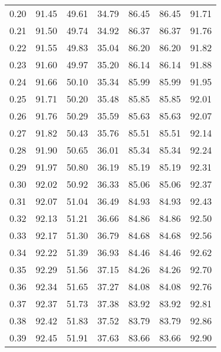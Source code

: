 \begin{tabular}{|c|c|c|c|c|c|c|}
      0.20 &     91.45 &     49.61 &      34.79 &   86.45 &      86.45 &         91.71 \\
      0.21 &     91.50 &     49.74 &      34.92 &   86.37 &      86.37 &         91.76 \\
      0.22 &     91.55 &     49.83 &      35.04 &   86.20 &      86.20 &         91.82 \\
      0.23 &     91.60 &     49.97 &      35.20 &   86.14 &      86.14 &         91.88 \\
      0.24 &     91.66 &     50.10 &      35.34 &   85.99 &      85.99 &         91.95 \\
      0.25 &     91.71 &     50.20 &      35.48 &   85.85 &      85.85 &         92.01 \\
      0.26 &     91.76 &     50.29 &      35.59 &   85.63 &      85.63 &         92.07 \\
      0.27 &     91.82 &     50.43 &      35.76 &   85.51 &      85.51 &         92.14 \\
      0.28 &     91.90 &     50.65 &      36.01 &   85.34 &      85.34 &         92.24 \\
      0.29 &     91.97 &     50.80 &      36.19 &   85.19 &      85.19 &         92.31 \\
      0.30 &     92.02 &     50.92 &      36.33 &   85.06 &      85.06 &         92.37 \\
      0.31 &     92.07 &     51.04 &      36.49 &   84.93 &      84.93 &         92.43 \\
      0.32 &     92.13 &     51.21 &      36.66 &   84.86 &      84.86 &         92.50 \\
      0.33 &     92.17 &     51.30 &      36.79 &   84.68 &      84.68 &         92.56 \\
      0.34 &     92.22 &     51.39 &      36.93 &   84.46 &      84.46 &         92.62 \\
      0.35 &     92.29 &     51.56 &      37.15 &   84.26 &      84.26 &         92.70 \\
      0.36 &     92.34 &     51.65 &      37.27 &   84.08 &      84.08 &         92.76 \\
      0.37 &     92.37 &     51.73 &      37.38 &   83.92 &      83.92 &         92.81 \\
      0.38 &     92.42 &     51.83 &      37.52 &   83.79 &      83.79 &         92.86 \\
      0.39 &     92.45 &     51.91 &      37.63 &   83.66 &      83.66 &         92.90 \\

\end{tabular}
